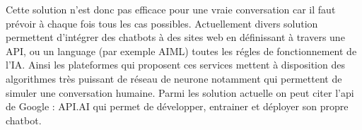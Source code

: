 \par Cette solution n'est donc pas efficace pour une vraie conversation car il faut prévoir à chaque fois tous les cas possibles. Actuellement divers solution permettent d'intégrer des chatbots à des sites web en définissant à travers une API, ou un language (par exemple AIML) toutes les régles de fonctionnement de l'IA. Ainsi les plateformes qui proposent ces services mettent à disposition des algorithmes très puissant de réseau de neurone notamment qui permettent de simuler une conversation humaine. Parmi les solution actuelle on peut citer l'api de Google : API.AI qui permet de développer, entrainer et déployer son propre chatbot. 



